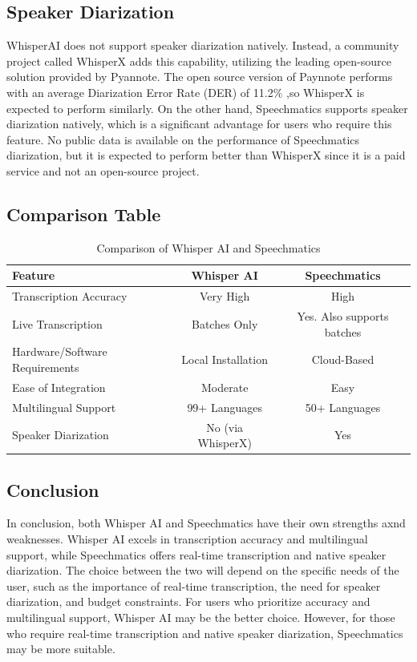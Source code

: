 \documentclass{article}
\begin{document}
\subsection{Speaker Diarization}
WhisperAI does not support speaker diarization natively. Instead, a community project called WhisperX adds this capability, utilizing the leading open-source solution provided by Pyannote. The open source version of Paynnote performs with an average Diarization Error Rate (DER) of 11.2\% \cite{whisperx_DER},so WhisperX is expected to perform similarly. On the other hand, Speechmatics supports speaker diarization natively, which is a significant advantage for users who require this feature. No public data is available on the performance of Speechmatics diarization, but it is expected to perform better than WhisperX since it is a paid service and not an open-source project.

\subsection{Comparison Table}
\begin{table}[h!]
\centering
\begin{tabular}{|l|c|c|}
\hline
\textbf{Feature} & \textbf{Whisper AI} & \textbf
{Speechmatics} \\
\hline
Transcription Accuracy & Very High & High \\
\hline
Live Transcription & Batches Only & Yes. Also supports batches \\
\hline
Hardware/Software Requirements & Local Installation & Cloud-Based \\
\hline
Ease of Integration & Moderate & Easy \\
\hline
Multilingual Support & 99+ Languages & 50+ Languages \\
\hline
Speaker Diarization & No (via WhisperX) & Yes \\
\hline

\end{tabular}
\caption{Comparison of Whisper AI and Speechmatics}
\end{table}

\subsection{Conclusion}
In conclusion, both Whisper AI and Speechmatics have their own strengths axnd weaknesses. Whisper AI excels in transcription accuracy and multilingual support, while Speechmatics offers real-time transcription and native speaker diarization. The choice between the two will depend on the specific needs of the user, such as the importance of real-time transcription, the need for speaker diarization, and budget constraints. For users who prioritize accuracy and multilingual support, Whisper AI may be the better choice. However, for those who require real-time transcription and native speaker diarization, Speechmatics may be more suitable.
\end{document}
